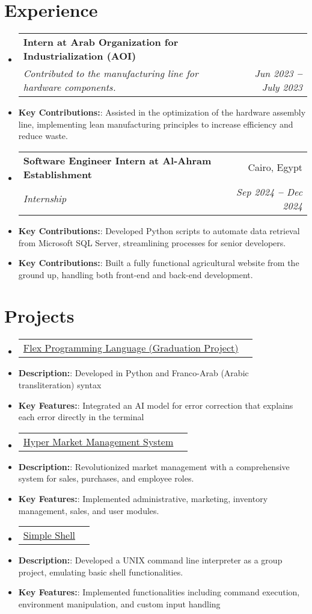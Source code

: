 \documentclass[letterpaper,10.5pt]{article}
\makeatletter
\newcommand{\resumeItem}[2]{
  \item\small{
    \textbf{#1}{: #2 \vspace{-2pt}}
  }
}
\newcommand{\resumeSubheading}[4]{
  \vspace{-2pt}\item
    \begin{tabular*}{0.97\textwidth}[t]{l@{\extracolsep{\fill}}r}
      \textbf{#1} & #2 \\
      \textit{\small#3} & \textit{\small #4} \\
    \end{tabular*}\vspace{-7pt}
}
\newcommand{\resumeProjectHeading}[2]{
    \vspace{-2pt}\item
    \begin{tabular*}{0.97\textwidth}{l@{\extracolsep{\fill}}r}
      \small#1 & #2 \\
    \end{tabular*}\vspace{-7pt}
}
\newcommand{\resumeSubItem}[2]{\resumeItem{#1}{#2}\vspace{-4pt}}
\newcommand{\resumeSubHeadingListStart}{\begin{itemize}[leftmargin=0.15in, label={}]}
\newcommand{\resumeSubHeadingListEnd}{\end{itemize}}
\newcommand{\resumeItemListStart}{\begin{itemize}}
\newcommand{\resumeItemListEnd}{\end{itemize}\vspace{-5pt}}
\makeatother
\begin{document}

\section{Experience}
\resumeSubHeadingListStart
  \resumeSubheading
    {Intern at Arab Organization for Industrialization (AOI)}{}
    {Contributed to the manufacturing line for hardware components.}{Jun 2023 \textbf{--} July 2023}
    {}{}
    \resumeSubItem
      {Key Contributions:}
      {Assisted in the optimization of the hardware assembly line, implementing lean manufacturing principles to increase efficiency and reduce waste.}
  \resumeSubheading
    {Software Engineer Intern at Al-Ahram Establishment}{Cairo, Egypt}
    {Internship}{Sep 2024 \textbf{--} Dec 2024}
    {}{}
    \resumeSubItem
      {Key Contributions:}
      {Developed Python scripts to automate data retrieval from Microsoft SQL Server, streamlining processes for senior developers.}
    \resumeSubItem
      {Key Contributions:}
      {Built a fully functional agricultural website from the ground up, handling both front-end and back-end development.}
\resumeSubHeadingListEnd


\section{Projects}
\resumeItemListStart
  \resumeProjectHeading
    {\href{https://github.com/Flex-Language}{Flex Programming Language (Graduation Project)}}
    {}
    \resumeSubItem
      {Description:}
      {Developed in Python and Franco-Arab (Arabic transliteration) syntax}
    \resumeSubItem
      {Key Features:}
      {Integrated an AI model for error correction that explains each error directly in the terminal}
  \resumeProjectHeading
    {\href{https://github.com/Hassan220022/Hyper-Market-Management-System}{Hyper Market Management System }}
    {}
    \resumeSubItem
      {Description:}
      {Revolutionized market management with a comprehensive system for sales, purchases, and employee roles.}
    \resumeSubItem
      {Key Features:}
      {Implemented administrative, marketing, inventory management, sales, and user modules.}
  \resumeProjectHeading
    {\href{https://github.com/Hassan220022/simple_shell}{Simple Shell}}
    {}
    \resumeSubItem
      {Description:}
      {Developed a UNIX command line interpreter as a group project, emulating basic shell functionalities.}
    \resumeSubItem
      {Key Features:}
      {Implemented functionalities including command execution, environment manipulation, and custom input handling}
\resumeItemListEnd
\end{document}

